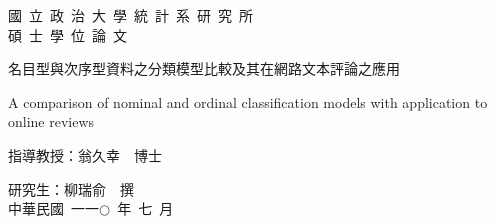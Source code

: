 
\usepackage{wallpaper}                                          %


\fontsize{12}{22pt}\selectfont
\thispagestyle{empty}
\vspace*{1cm}
 \begin{center}
    \huge 國~立~政~治~大~學~統~計~系~研~究~所 \\ 碩~士~學~位~論~文
 \end{center}
\vspace*{2cm}

\vspace*{3cm}
 \begin{center}
    \LARGE 名目型與次序型資料之分類模型比較及其在網路文本評論之應用
 \end{center}

 \begin{center}    			   
      \Large A comparison of nominal and ordinal classification models with application to online reviews
 \end{center}
\vspace*{6cm}
 \begin{center}
    \LARGE 指導教授：翁久幸~~博士 \\
 \end{center}
\begin{center}
    \LARGE 研究生：柳瑞俞~~撰\\
\vspace*{2cm}
    \LARGE 中華民國~一一$\bigcirc$~年~七~月
\end{center}

\newpage
\cleardoublepage

\setcounter{tocdepth}{2}		%

\newpage
\cleardoublepage		
\fontsize{12}{22pt}\selectfont 	%
\fancyfoot[C]{\thepage}


\tableofcontents
\newpage
\renewcommand{\numberline}[1]{\loflabel~#1\hspace*{1em}}%
\listoffigures %
\newpage
\renewcommand{\numberline}[1]{\lotlabel~#1\hspace*{1em}}%
\listoftables %
\newpage
\thispagestyle{empty}


